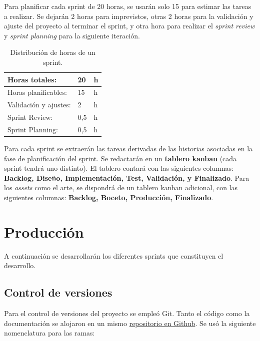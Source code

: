 Para planificar cada sprint de 20 horas, se usarán solo 15 para estimar las tareas a realizar. Se dejarán 2 horas para imprevistos, otras 2 horas para la validación y ajuste del proyecto al terminar el sprint, y otra hora para realizar el \textit{sprint review} y \textit{sprint planning} para la siguiente iteración.

\begin{table}[htb]
    \centering
    \begin{tabular}{|l|l|l|}
    \hline
        Horas totales: & 20 & h \\ \hline
        Horas planificables: & 15 & h \\ \hline
        Validación y ajustes: & 2 & h \\ \hline
        Sprint Review: & 0,5 & h \\ \hline
        Sprint Planning: & 0,5 & h \\ \hline
    \end{tabular}
    \caption{Distribución de horas de un sprint.}
\end{table} 

Para cada sprint se extraerán las tareas derivadas de las historias asociadas en la fase de planificación del sprint. Se redactarán en un \textbf{tablero kanban} (cada sprint tendrá uno distinto). El tablero contará con las siguientes columnas: \textbf{Backlog, Diseño, Implementación, Test, Validación, y Finalizado}. Para los \textit{assets} como el arte, se dispondrá de un tablero kanban adicional, con las siguientes columnas: \textbf{Backlog, Boceto, Producción, Finalizado}.

\section{Producción}

A continuación se desarrollarán los diferentes sprints que constituyen el desarrollo.

\subsection{Control de versiones}

Para el control de versiones del proyecto se empleó Git. Tanto el código como la documentación se alojaron en un mismo \href{https://github.com/pabloMillanCb/tfm}{repositorio en Github}. Se usó la siguiente nomenclatura para las ramas:

